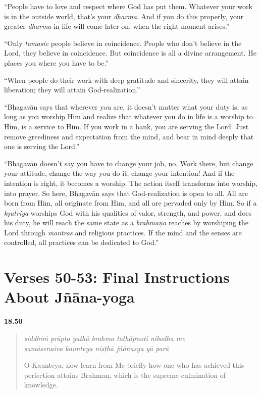 \enquote{People have to love and respect where God has put them. Whatever your work is in the outside world, that’s your \textit{dharma}. And if you do this properly, your greater \textit{dharma} in life will come later on, when the right moment arises.}

\enquote{Only \textit{tamasic} people believe in coincidence. People who don’t believe in the Lord, they believe in coincidence. But coincidence is all a divine arrangement. He places you where you have to be.}

\enquote{When people do their work with deep gratitude and sincerity, they will attain liberation; they will attain God-realization.}

\enquote{Bhagavān says that wherever you are, it doesn’t matter what your duty is, as long as you worship Him and realize that whatever you do in life is a worship to Him, is a service to Him. If you work in a bank, you are serving the Lord. Just remove greediness and expectation from the mind, and bear in mind deeply that one is serving the Lord.}

\enquote{Bhagavān doesn’t say you have to change your job, no. Work there, but change your attitude, change the way you do it, change your intention! And if the intention is right, it becomes a worship. The action itself transforms into worship, into prayer. So here, Bhagavān says that God-realization is open to all. All are born from Him, all originate from Him, and all are pervaded only by Him. So if a \textit{kṣatriya} worships God with his qualities of valor, strength, and power, and does his duty, he will reach the same state as a \textit{brāhmaṇa} reaches by worshiping the Lord through \textit{mantras} and religious practices. If the mind and the senses are controlled, all practices can be dedicated to God.}

\newpage
\section{Verses 50-53: Final Instructions About Jñāna-yoga}\label{sec-verses-50-53-final-instructions-about-jnana-yoga}


\par\noindent\textbf{18.50}\par
\begin{verse}
\textit{siddhiṁ prāpto yathā brahma tathāpnoti nibodha me} \\
\textit{samāsenaiva kaunteya niṣṭhā jñānasya yā parā}

\noindent O Kaunteya, now learn from Me briefly how one who has achieved this perfection attains Brahman, which is the supreme culmination of knowledge.
\end{verse}
\par



